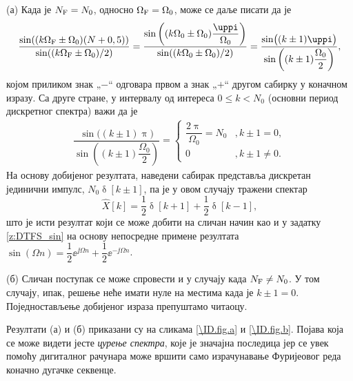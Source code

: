 (а) Када је $N_{\rm F} = N_0$, односно $\Omega_{\rm F} = \Omega_0$, може се даље писати да је 
\begin{eqnarray}
    \dfrac{\sin( (k \Omega_{\rm F} \pm \Omega_0)(N + 0,5) ) }{ \sin((k \Omega_{\rm F} \pm \Omega_0)/2) }
    = 
    \dfrac{\sin \left( (k \Omega_{\rm 0} \pm \Omega_0) \dfrac{\uppi}{\Omega_0} \right) }{ \sin((k \Omega_{\rm 0} \pm \Omega_0)/2) } 
    = \dfrac{ \sin \bigl( (k \pm 1)\uppi \bigr) }{ \sin \left( (k \pm 1)\dfrac{\Omega_0}2 \right)},
\end{eqnarray}
којом приликом знак „$-$“ одговара првом а знак „$+$“ другом сабирку у коначном изразу.
Са друге стране, у интервалу од интереса $ 0 \leq k < N_{0}$ (основни период дискретног спектра) важи да је 
\begin{eqnarray}
    \dfrac{ \sin \bigl( (k \pm 1)\uppi \bigr) }{ \sin \left( (k \pm 1)\dfrac{\Omega_0}2 \right)} = 
    \begin{cases}
        \dfrac{2\uppi}{\Omega_0} = N_0 &, k \pm 1 = 0, \\
        0 &, k \pm 1 \neq 0.
    \end{cases}
\end{eqnarray}
На основу добијеног резултата, наведени сабирак представља дискретан јединични импулс, 
$N_0 \updelta[k \pm 1]$, па је у овом случају тражени спектар
\begin{equation}
    \hat X[k] = \dfrac{1}{2}\updelta[k + 1] + \dfrac{1}{2}\updelta[k - 1],
\end{equation}
што је исти резултат који се може добити на сличан начин као и у задатку \ref{z:DTFS_sin} на основу непосредне примене резултата
$\sin({\Omega n}) = \dfrac{1}{2} \ee^{\jj\Omega n} + \dfrac{1}{2} \ee^{-\jj\Omega n}$.

(б) Сличан поступак се може спровести и у случају када $N_{\rm F} \neq N_0$. У том случају, ипак, решење неће имати нуле на местима када је 
$k \pm 1 = 0$. Поједностављење добијеног израза препуштамо читаоцу. 

Резултати (а) и (б) приказани су на сликама \ref{\ID.fig.a} и \ref{\ID.fig.b}. 
Појава која се може видети јесте \textit{цурење спектра}, које је значајна последица јер се увек помоћу дигиталног рачунара 
може вршити само израчунавање Фуријеовог реда коначно дугачке секвенце.


